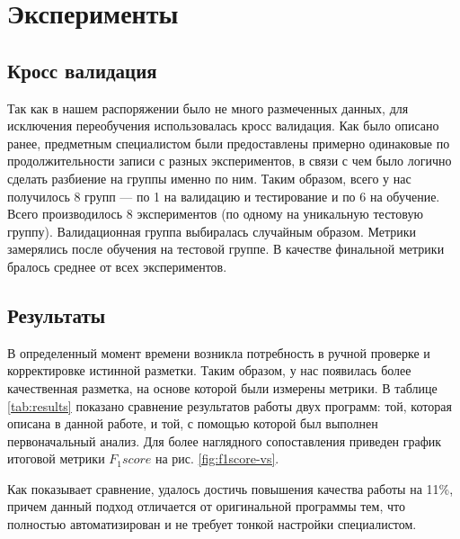 \chapter{Эксперименты}

\section{Кросс валидация}
Так как в нашем распоряжении было не много размеченных данных, для исключения
переобучения использовалась кросс валидация. Как было описано ранее, предметным
специалистом были предоставлены примерно одинаковые по продолжительности записи
с разных экспериментов, в связи с чем было логично сделать разбиение на группы
именно по ним. Таким образом, всего у нас получилось 8 групп --- по 1 на
валидацию и тестирование и по 6 на обучение. Всего производилось 8
экспериментов (по одному на уникальную тестовую группу). Валидационная группа
выбиралась случайным образом. Метрики замерялись после обучения на тестовой
группе. В качестве финальной метрики бралось среднее от всех экспериментов.

\section{Результаты}

В определенный момент времени возникла потребность в ручной проверке и
корректировке истинной разметки. Таким образом, у нас появилась более
качественная разметка, на основе которой были измерены метрики. В таблице
\ref{tab:results} показано сравнение результатов работы двух программ: той,
которая описана в данной работе, и той, с помощью которой был выполнен
первоначальный анализ. Для более наглядного сопоставления приведен график
итоговой метрики $F_1score$ на рис. \ref{fig:f1score-vs}.

Как показывает сравнение, удалось достичь повышения качества работы на 11\%,
причем данный подход отличается от оригинальной программы тем, что полностью
автоматизирован и не требует тонкой настройки специалистом.

